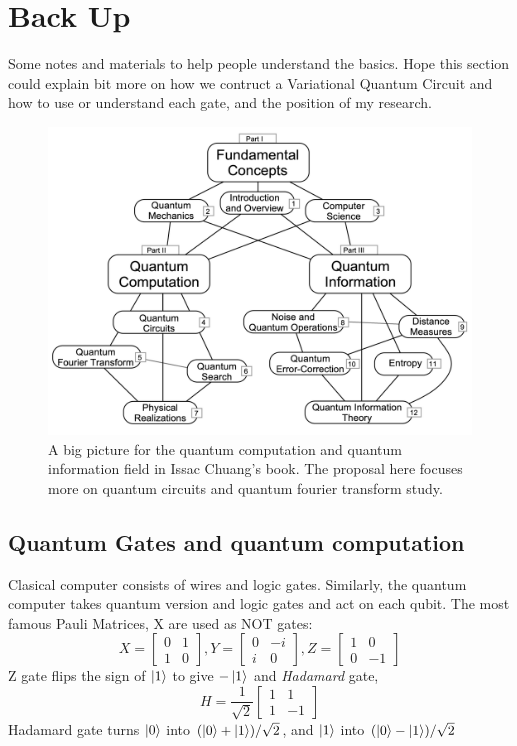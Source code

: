\documentclass{article}
\begin{document}
\section*{Back Up}
Some notes and materials to help people understand the basics. Hope this 
section could explain bit more on how we contruct a Variational Quantum 
Circuit and how to use or understand each gate, and the position of my 
research. 
\begin{figure}
  \includegraphics[width=\textwidth]{category.png}
  \caption{A big picture for the quantum computation and 
  quantum information field in Issac Chuang's book. The proposal 
  here focuses more on quantum circuits and quantum fourier transform study. }
\end{figure}

\subsection*{Quantum Gates and quantum computation}
Clasical computer consists of wires and logic gates. Similarly, 
the quantum computer takes quantum version and logic gates and act on 
each qubit. The most famous Pauli Matrices, X are used as NOT gates: 
\begin{equation}
  X = \begin{bmatrix}
    0 & 1 \\ 1 & 0 
  \end{bmatrix},
  Y = \begin{bmatrix}
    0 & -i \\ i & 0 
  \end{bmatrix},
  Z = \begin{bmatrix}
    1 & 0 \\ 0 & -1 
  \end{bmatrix}
\end{equation}
Z gate flips the sign of $\ket{1}$ to give $-\ket{1}$ and 
\textit{Hadamard} gate, 
\begin{equation}
  H =  \frac{1}{\sqrt{2}}\begin{bmatrix}
    1 & 1 \\ 1 & -1
  \end{bmatrix}
\end{equation}
Hadamard gate turns $\ket{0}$ into $(\ket{0}+\ket{1})/\sqrt{2}$, and 
$\ket{1}$ into $(\ket{0}-\ket{1})/\sqrt{2}$
\end{document}
